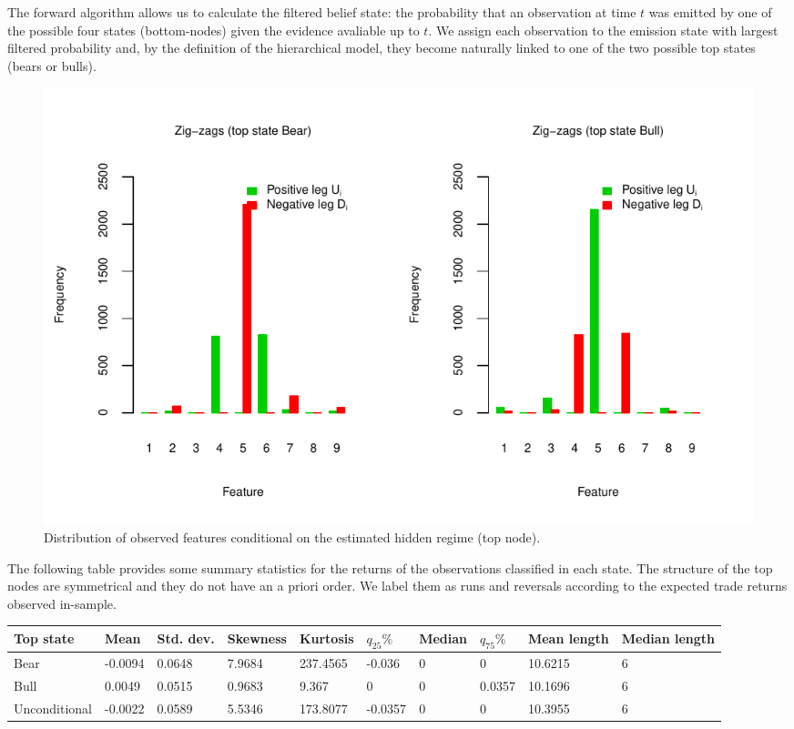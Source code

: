 \documentclass[]{article}
\begin{document}
The forward algorithm allows us to calculate the filtered belief state:
the probability that an observation at time \(t\) was emitted by one of
the possible four states (bottom-nodes) given the evidence avaliable up
to \(t\). We assign each observation to the emission state with largest
filtered probability and, by the definition of the hierarchical model,
they become naturally linked to one of the two possible top states
(bears or bulls).

\begin{figure}[H]
\includegraphics[width=\textwidth]{main_files/figure-latex/unnamed-chunk-13-1} \caption{Distribution of observed features conditional on the estimated hidden regime (top node). \label{tseg-ins-features-hist}}\label{fig:unnamed-chunk-13}
\end{figure}

The following table provides some summary statistics for the returns of
the observations classified in each state. The structure of the top
nodes are symmetrical and they do not have an a priori order. We label
them as runs and reversals according to the expected trade returns
observed in-sample.

\footnotesize

\begin{longtable}[]{@{}llllllllll@{}}
\toprule
Top state & Mean & Std. dev. & Skewness & Kurtosis & \(q_{25}\%\) &
Median & \(q_{75}\%\) & Mean length & Median length\tabularnewline
\midrule
\endhead
Bear & -0.0094 & 0.0648 & 7.9684 & 237.4565 & -0.036 & 0 & 0 & 10.6215 &
6\tabularnewline
Bull & 0.0049 & 0.0515 & 0.9683 & 9.367 & 0 & 0 & 0.0357 & 10.1696 &
6\tabularnewline
Unconditional & -0.0022 & 0.0589 & 5.5346 & 173.8077 & -0.0357 & 0 & 0 &
10.3955 & 6\tabularnewline
\bottomrule
\end{longtable}
\end{document}
